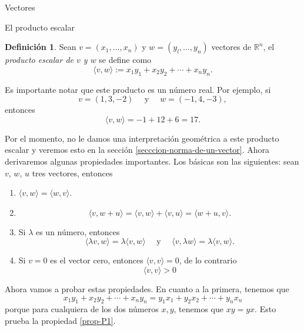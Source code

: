 \documentclass[a4paper,12pt,twoside,spanish,reqno]{amsbook}
\theoremstyle{definition}
\newtheorem{definicion}{Definici\'on}[section]
\theoremstyle{remark}
\newcommand{\R}{\mathbb R}
\begin{document}
\begin{chapter}{Vectores}
\begin{section}{El producto escalar}
		\begin{definicion}
			Sean  $v = (x_1, \ldots,x_n)$ y $w= (y_l, \ldots,y_n)$ vectores de $\R^n$,  el \textit{producto escalar de $v$ y $w$} se define como		
			\begin{equation*}
			\langle v , w \rangle :=x_1y_1 + x_2y_2+\cdots+x_ny_n.
			\end{equation*}
		\end{definicion}
		
		
		
		Es importante notar  que este producto es un número real. Por ejemplo, si
		\begin{equation*}
			v= (1, 3, - 2) \quad\text{ y } \quad w= (- 1, 4, - 3),
		\end{equation*}
		entonces
		\begin{equation*}
			\langle v , w \rangle= - 1 + 12 + 6 = 17.
		\end{equation*}
		
		Por el momento, no le damos una interpretación geométrica a este producto escalar y veremos esto en la sección \ref{secccion-norma-de-un-vector}. Ahora derivaremos algunas propiedades importantes. Los básicas son las siguientes: sean $v$, $w$, $u$  tres vectores, entonces
		
		
		\begin{enumerate}[label=\textbf{P\arabic*.},ref=P\arabic*]
			\item\label{prop-P1}	$\langle v , w \rangle = \langle w , v \rangle$.
			\item\label{prop-P2} 
			\begin{equation*}
				\langle v , w + u \rangle =\langle v , w \rangle + \langle v , u \rangle = \langle w +u , v \rangle.
			\end{equation*}
			\item\label{prop-P3} Si $\lambda$ es un número, entonces 
			\begin{equation*}
				\langle \lambda v , w \rangle = \lambda \langle v , w \rangle \quad \text{ y } \quad  \langle v , \lambda w \rangle = \lambda \langle v , w \rangle.
			\end{equation*}
			\item\label{prop-P4} Si $v=0$ es el vector cero, entonces $\langle v , v \rangle =0$,  de lo contrario
			\begin{equation*}
				\langle v , v \rangle >0
			\end{equation*}
		\end{enumerate}
		
		Ahora vamos a probar estas propiedades. En cuanto a la primera, tenemos que
		\begin{equation*}
			x_1y_1 + x_2y_2+\cdots+x_ny_n = y_1x_1 + y_2x_2+\cdots+y_nx_n
		\end{equation*}
		porque para cualquiera de los dos números $x, y$, tenemos que $xy=yx$. Esto prueba la propiedad \ref{prop-P1}. 
		

\end{section}
\end{chapter}
\end{document}
